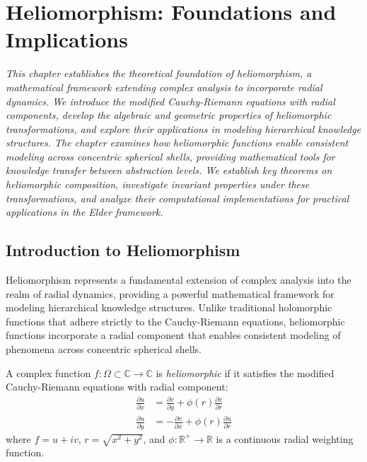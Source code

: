 \chapter{Heliomorphism: Foundations and Implications}

\textit{This chapter establishes the theoretical foundation of heliomorphism, a mathematical framework extending complex analysis to incorporate radial dynamics. We introduce the modified Cauchy-Riemann equations with radial components, develop the algebraic and geometric properties of heliomorphic transformations, and explore their applications in modeling hierarchical knowledge structures. The chapter examines how heliomorphic functions enable consistent modeling across concentric spherical shells, providing mathematical tools for knowledge transfer between abstraction levels. We establish key theorems on heliomorphic composition, investigate invariant properties under these transformations, and analyze their computational implementations for practical applications in the Elder framework.}

\section{Introduction to Heliomorphism}

Heliomorphism represents a fundamental extension of complex analysis into the realm of radial dynamics, providing a powerful mathematical framework for modeling hierarchical knowledge structures. Unlike traditional holomorphic functions that adhere strictly to the Cauchy-Riemann equations, heliomorphic functions incorporate a radial component that enables consistent modeling of phenomena across concentric spherical shells.

\begin{definition}
A complex function $f: \Omega \subset \mathbb{C} \rightarrow \mathbb{C}$ is \textit{heliomorphic} if it satisfies the modified Cauchy-Riemann equations with radial component:
\begin{align}
\frac{\partial u}{\partial x} &= \frac{\partial v}{\partial y} + \phi(r)\frac{\partial v}{\partial r} \\
\frac{\partial u}{\partial y} &= -\frac{\partial v}{\partial x} + \phi(r)\frac{\partial u}{\partial r}
\end{align}
where $f = u + iv$, $r = \sqrt{x^2 + y^2}$, and $\phi: \mathbb{R}^+ \rightarrow \mathbb{R}$ is a continuous radial weighting function.
\end{definition}

